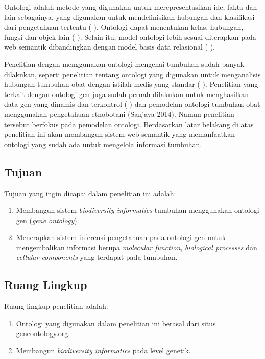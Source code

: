 Ontologi adalah metode yang digunakan untuk merepresentasikan ide, fakta dan lain sebagainya, yang digunakan untuk mendefinisikan hubungan dan klasifikasi dari pengetahuan tertentu (\citeauthor{JEPSEN2010} \cite*{JEPSEN2010}). Ontologi dapat menentukan kelas, hubungan, fungsi dan objek lain (\citeauthor{DILECCE2008} \cite*{DILECCE2008}). Selain itu, model ontologi lebih sesuai diterapkan pada web semantik dibandingkan dengan model basis data relasional (\citeauthor{LAALLAM2013} \cite*{LAALLAM2013}).

Penelitian dengan menggunakan ontologi mengenai tumbuhan sudah banyak dilakukan, seperti penelitian tentang ontologi yang digunakan untuk menganalisis hubungan tumbuhan obat dengan istilah medis yang standar (\citeauthor{VADIVU2012} \cite*{VADIVU2012}). Penelitian yang terkait dengan ontologi gen juga sudah pernah dilakukan untuk menghasilkan data gen yang dinamis dan terkontrol (\citeauthor{ASHBURNERM2000} \cite*{ASHBURNERM2000}) dan pemodelan ontologi tumbuhan obat menggunakan pengetahuan etnobotani (Sanjaya 2014). Namun penelitian tersebut berfokus pada pemodelan ontologi. Berdasarkan latar belakang di atas penelitian ini akan membangun sistem web semantik yang memanfaatkan ontologi yang sudah ada untuk mengelola informasi tumbuhan.

\subsection*{Tujuan}
Tujuan yang ingin dicapai dalam penelitian ini adalah:
\begin{enumerate}[noitemsep] 
\item Membangun sistem \textit{biodiversity informatics} tumbuhan menggunakan ontologi gen (\textit{gene ontology}).
\item Menerapkan sistem inferensi pengetahuan pada ontologi gen untuk mengembalikan informasi berupa \textit{molecular function}, \textit{biological processes} dan \textit{cellular components} yang terdapat pada tumbuhan.
\end{enumerate}

\subsection*{Ruang Lingkup}
Ruang lingkup penelitian adalah:
\begin{enumerate}[noitemsep] 
\item Ontologi yang digunakan dalam penelitian ini berasal dari situs geneontology.org.
\item Membangun \textit{biodiversity informatics} pada level genetik.
\end{enumerate}

